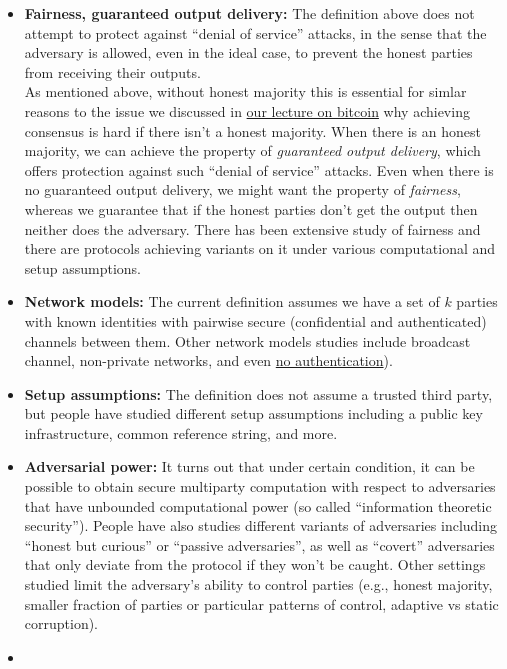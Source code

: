 \begin{itemize}
\item
  \textbf{Fairness, guaranteed output delivery:} The definition above
  does not attempt to protect against ``denial of service'' attacks, in
  the sense that the adversary is allowed, even in the ideal case, to
  prevent the honest parties from receiving their outputs.\\
  As mentioned above, without honest majority this is essential for
  simlar reasons to the issue we discussed in
  \href{http://www.boazbarak.org/cs127/chap07_hash_functions.pdf}{our
  lecture on bitcoin} why achieving consensus is hard if there isn't a
  honest majority. When there is an honest majority, we can achieve the
  property of \emph{guaranteed output delivery}, which offers protection
  against such ``denial of service'' attacks. Even when there is no
  guaranteed output delivery, we might want the property of
  \emph{fairness}, whereas we guarantee that if the honest parties don't
  get the output then neither does the adversary. There has been
  extensive study of fairness and there are protocols achieving variants
  on it under various computational and setup assumptions.
\item
  \textbf{Network models:} The current definition assumes we have a set
  of \(k\) parties with known identities with pairwise secure
  (confidential and authenticated) channels between them. Other network
  models studies include broadcast channel, non-private networks, and
  even \href{https://eprint.iacr.org/2007/464}{no authentication}).
\item
  \textbf{Setup assumptions:} The definition does not assume a trusted
  third party, but people have studied different setup assumptions
  including a public key infrastructure, common reference string, and
  more.
\item
  \textbf{Adversarial power:} It turns out that under certain condition,
  it can be possible to obtain secure multiparty computation with
  respect to adversaries that have unbounded computational power (so
  called ``information theoretic security''). People have also studies
  different variants of adversaries including ``honest but curious'' or
  ``passive adversaries'', as well as ``covert'' adversaries that only
  deviate from the protocol if they won't be caught. Other settings
  studied limit the adversary's ability to control parties (e.g., honest
  majority, smaller fraction of parties or particular patterns of
  control, adaptive vs static corruption).
\item

\end{itemize}
